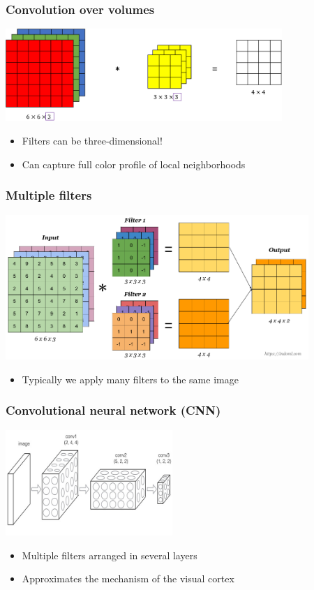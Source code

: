 \documentclass[10pt]{beamer}
\begin{document}
\begin{frame}
\frametitle{Convolution over volumes}
\centerline{\includegraphics[height=3.5cm]{images/volumes.png}}
\begin{itemize}
\item Filters can be three-dimensional!
\item Can capture full color profile of local neighborhoods
\end{itemize}
\end{frame}

\begin{frame}
\frametitle{Multiple filters}
\centerline{\includegraphics[height=5.5cm]{images/multiple.png}}
\begin{itemize}
\item Typically we apply {\color{red} many} filters to the same image
\end{itemize}
\end{frame}

\begin{frame}
\frametitle{Convolutional neural network (CNN)}
\centerline{\includegraphics[height=4cm]{images/conv.png}}
\begin{itemize}
\item Multiple filters arranged in several layers
\item Approximates the mechanism of the visual cortex 
\end{itemize}
\end{frame}
\end{document}
